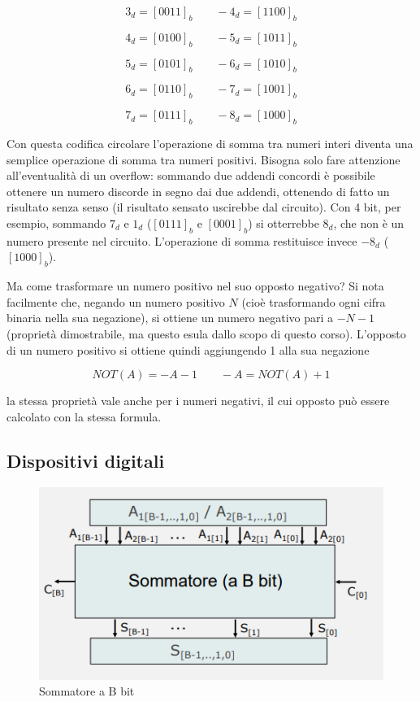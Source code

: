 \documentclass{article}
\begin{document}
\[3_d = [0011]_b\quad \quad -4_d = [1100]_b\]

\[4_d = [0100]_b\quad \quad -5_d = [1011]_b\]

\[5_d = [0101]_b\quad \quad -6_d = [1010]_b\]

\[6_d = [0110]_b\quad \quad -7_d = [1001]_b\]

\[7_d = [0111]_b\quad \quad -8_d = [1000]_b\]

Con questa codifica circolare l'operazione di somma tra numeri interi diventa una semplice operazione di somma tra numeri positivi. Bisogna solo fare attenzione all'eventualità di un overflow: sommando due addendi concordi è possibile ottenere un numero discorde in segno dai due addendi, ottenendo di fatto un risultato senza senso (il risultato sensato uscirebbe dal circuito). Con 4 bit, per esempio, sommando $7_d$ e $1_d$ ($[0111]_b$ e $[0001]_b$) si otterrebbe $8_d$, che non è un numero presente nel circuito. L'operazione di somma restituisce invece $-8_d$ ($[1000]_b$). 

\vspace{3mm}

Ma come trasformare un numero positivo nel suo opposto negativo? Si nota facilmente che, negando un numero positivo $N$ (cioè trasformando ogni cifra binaria nella sua negazione), si ottiene un numero negativo pari a $-N -1$ (proprietà dimostrabile, ma questo esula dallo scopo di questo corso). L'opposto di un numero positivo si ottiene quindi aggiungendo 1 alla sua negazione

\[NOT(A) = -A -1 \quad \quad -A = NOT(A) + 1\]

la stessa proprietà vale anche per i numeri negativi, il cui opposto può essere calcolato con la stessa formula.

\clearpage








\subsection{Dispositivi digitali}

\begin{figure}[h]
  \centering
  \includegraphics[scale=0.7]{IM_sommatore_B_bit}
  \caption{Sommatore a B bit}
  \label{sommatore_B_bit}
\end{figure}
\end{document}
